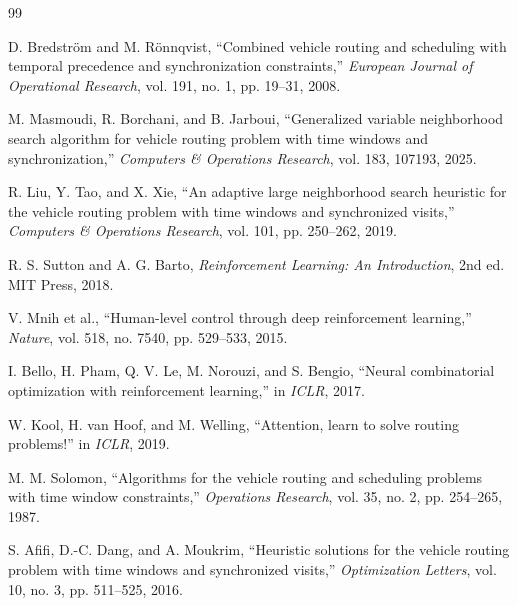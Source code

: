 \documentclass[final,11pt,times]{elsarticle}
\begin{document}
\begin{thebibliography}{99}

 D. Bredstr\"om and M. R\"onnqvist, ``Combined vehicle routing and scheduling with temporal precedence and synchronization constraints,'' \textit{European Journal of Operational Research}, vol. 191, no. 1, pp. 19–31, 2008.

 M. Masmoudi, R. Borchani, and B. Jarboui, ``Generalized variable neighborhood search algorithm for vehicle routing problem with time windows and synchronization,'' \textit{Computers \& Operations Research}, vol. 183, 107193, 2025.

 R. Liu, Y. Tao, and X. Xie, ``An adaptive large neighborhood search heuristic for the vehicle routing problem with time windows and synchronized visits,'' \textit{Computers \& Operations Research}, vol. 101, pp. 250–262, 2019.

 R. S. Sutton and A. G. Barto, \textit{Reinforcement Learning: An Introduction}, 2nd ed. MIT Press, 2018.

 V. Mnih et al., ``Human-level control through deep reinforcement learning,'' \textit{Nature}, vol. 518, no. 7540, pp. 529–533, 2015.

 I. Bello, H. Pham, Q. V. Le, M. Norouzi, and S. Bengio, ``Neural combinatorial optimization with reinforcement learning,'' in \textit{ICLR}, 2017.

 W. Kool, H. van Hoof, and M. Welling, ``Attention, learn to solve routing problems!'' in \textit{ICLR}, 2019.

 M. M. Solomon, ``Algorithms for the vehicle routing and scheduling problems with time window constraints,'' \textit{Operations Research}, vol. 35, no. 2, pp. 254–265, 1987.

 S. Afifi, D.-C. Dang, and A. Moukrim, ``Heuristic solutions for the vehicle routing problem with time windows and synchronized visits,'' \textit{Optimization Letters}, vol. 10, no. 3, pp. 511–525, 2016.

\end{thebibliography}
\end{document}
